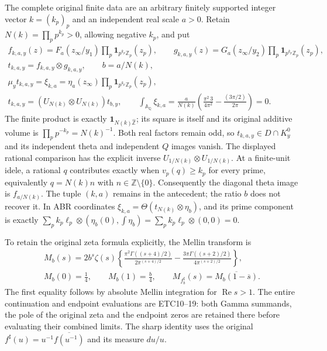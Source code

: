 The complete original finite data are an arbitrary finitely supported
integer vector $k=(k_p)_p$ and an independent real scale $a>0$.
Retain $N(k)=\prod_p p^{k_p}>0$, allowing negative $k_p$, and put
\begin{equation}\tag{DOR20a}
\begin{gathered}
f_{k,a,y}(z)=F_a(z_\infty/y_1)
                \prod_p\mathbf1_{p^{k_p}\mathbb Z_p}(z_p),\qquad
g_{k,a,y}(z)=G_a(z_\infty/y_2)
                \prod_p\mathbf1_{p^{k_p}\mathbb Z_p}(z_p),\\
t_{k,a,y}=f_{k,a,y}\otimes g_{k,a,y},\qquad b=a/N(k),\\
\mu_y t_{k,a,y}=\xi_{k,a}
 =\eta_a(z_\infty)\prod_p\mathbf1_{p^{k_p}\mathbb Z_p}(z_p),\\
t_{k,a,y}=(U_{N(k)}\otimes U_{N(k)})t_{b,y},\qquad
\int_{\mathbb A_\mathbb Q}\xi_{k,a}
=\frac{a}{N(k)}
 \left(\frac{\pi^2\,3}{4\pi^2}-\frac{(3\pi/2)}{2\pi}\right)=0.
\end{gathered}
\end{equation}
The finite product is exactly $\mathbf1_{N(k)\widehat{\mathbb Z}}$;
its square is itself and its original additive volume is
$\prod_p p^{-k_p}=N(k)^{-1}$. Both real factors remain odd,
so $t_{k,a,y}\in D\cap K_y^0$ and its independent theta and
independent $Q$ images vanish. The displayed rational comparison
has the explicit inverse $U_{1/N(k)}\otimes U_{1/N(k)}$.
At a finite-unit idele, a rational $q$ contributes exactly when
$v_p(q)\ge k_p$ for every prime, equivalently $q=N(k)n$ with
$n\in\mathbb Z\setminus\{0\}$. Consequently the diagonal theta
image is $f_{a/N(k)}$. The tuple $(k,a)$ remains in the antecedent;
the ratio $b$ does not recover it. In ABR coordinates
$\xi_{k,a}=\Theta(t_{N(k)}\otimes\eta_b)$, and its prime component
is exactly $\sum_p k_p\ell_p\otimes(\eta_b(0),\int\eta_b)
=\sum_p k_p\ell_p\otimes(0,0)=0$.

To retain the original zeta formula explicitly, the Mellin transform is
\begin{equation}\tag{DOR21}
\begin{gathered}
M_b(s)=2b^s\zeta(s)
\left\{\frac{\pi^2\Gamma((s+4)/2)}{2\pi^{(s+4)/2}}
-\frac{3\pi\Gamma((s+2)/2)}{4\pi^{(s+2)/2}}\right\},\\
M_b(0)=\frac14,\qquad M_b(1)=\frac b4,\qquad
M_{f_b^\sharp}(s)=\overline{M_b(1-\overline s)}.
\end{gathered}
\end{equation}
The first equality follows by absolute Mellin integration for
$\operatorname{Re}s>1$. The entire continuation and endpoint evaluations
are ETC10--19: both Gamma summands, the pole of the original zeta and
the endpoint zeros are retained there before evaluating their combined
limits. The sharp identity uses the original
$f^\sharp(u)=u^{-1}\overline{f(u^{-1})}$ and its measure $du/u$.

